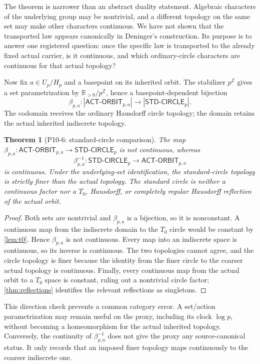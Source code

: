 \documentclass[11pt]{article}
\newtheorem{theorem}{Theorem}[section]
\theoremstyle{definition}
\newcommand{\R}{\mathbb R}
\newcommand{\Z}{\mathbb Z}
\newcommand{\ACTO}{\mathsf{ACT\mbox{-}ORBIT}_{p,a}}
\newcommand{\STDC}{\mathsf{STD\mbox{-}CIRCLE}_p}
\begin{document}
The theorem is narrower than an abstract duality statement.  Algebraic characters of the underlying group may be nontrivial, and a different topology on the same set may make other characters continuous.  We have not shown that the transported law appears canonically in Deninger's construction.  Its purpose is to answer one registered question: once the specific law is transported to the already fixed actual carrier, is it continuous, and which ordinary-circle characters are continuous for that actual topology?

Now fix $a\in U_p/H_p$ and a basepoint on its inherited orbit.  The stabilizer $p^{\Z}$ gives a set parametrization by $\R_{>0}/p^{\Z}$, hence a basepoint-dependent bijection
\[
 \beta_{p,a}:|\ACTO|\longrightarrow|\STDC|.
\]
The codomain receives the ordinary Hausdorff circle topology; the domain retains the actual inherited indiscrete topology.

\begin{theorem}[P10-6: standard-circle comparison]
\label{thm:circle}
The map $\beta_{p,a}:\ACTO\to\STDC$ is not continuous, whereas
\[
 \beta_{p,a}^{-1}:\STDC\longrightarrow\ACTO
\]
is continuous.  Under the underlying-set identification, the standard-circle topology is strictly finer than the actual topology.  The standard circle is neither a continuous factor nor a $T_0$, Hausdorff, or completely regular Hausdorff reflection of the actual orbit.
\end{theorem}

\begin{proof}
Both sets are nontrivial and $\beta_{p,a}$ is a bijection, so it is nonconstant.  A continuous map from the indiscrete domain to the $T_0$ circle would be constant by \cref{lem:t0}.  Hence $\beta_{p,a}$ is not continuous.  Every map into an indiscrete space is continuous, so its inverse is continuous.  The two topologies cannot agree, and the circle topology is finer because the identity from the finer circle to the coarser actual topology is continuous.  Finally, every continuous map from the actual orbit to a $T_0$ space is constant, ruling out a nontrivial circle factor; \cref{thm:reflections} identifies the relevant reflections as singletons.
\end{proof}

This direction check prevents a common category error.  A set/action parametrization may remain useful on the proxy, including its clock $\log p$, without becoming a homeomorphism for the actual inherited topology.  Conversely, the continuity of $\beta^{-1}_{p,a}$ does not give the proxy any source-canonical status.  It only records that an imposed finer topology maps continuously to the coarser indiscrete one.
\end{document}
